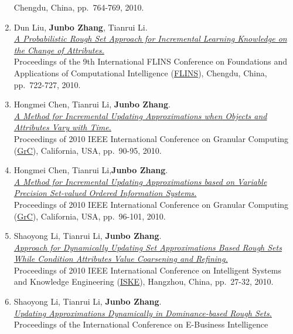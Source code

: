 \documentclass[]{article}
\begin{document}
\begin{enumerate}
  Chengdu, China, pp.~764-769, 2010.
\item
  Dun Liu, \textbf{Junbo Zhang}, Tianrui Li.\\
  \href{http://dx.doi.org/10.1142/9789814324700_0109}{\emph{A
  Probabilistic Rough Set Approach for Incremental Learning Knowledge on
  the Change of Attributes.}}\\ Proceedings of the 9th International
  FLINS Conference on Foundations and Applications of Computational
  Intelligence
  (\href{http://www.wikicfp.com/cfp/servlet/event.showcfp?eventid=7359\&copyownerid=2}{FLINS}),
  Chengdu, China, pp.~722-727, 2010.
\item
  Hongmei Chen, Tianrui Li, \textbf{Junbo Zhang}.\\
  \href{http://dx.doi.org/10.1109/GrC.2010.116}{\emph{A Method for
  Incremental Updating Approximations when Objects and Attributes Vary
  with Time.}}\\ Proceedings of 2010 IEEE International Conference on
  Granular Computing
  (\href{http://xanadu.cs.sjsu.edu/~grc/grc2010}{GrC}), California, USA,
  pp.~90-95, 2010.
\item
  Hongmei Chen, Tianrui Li,\textbf{Junbo Zhang}.\\
  \href{http://dx.doi.org/10.1109/GrC.2010.115}{\emph{A Method for
  Incremental Updating Approximations based on Variable Precision
  Set-valued Ordered Information Systems.}}\\ Proceedings of 2010 IEEE
  International Conference on Granular Computing
  (\href{http://xanadu.cs.sjsu.edu/~grc/grc2010}{GrC}), California, USA,
  pp.~96-101, 2010.
\item
  Shaoyong Li, Tianrui Li, \textbf{Junbo Zhang}.\\
  \href{http://dx.doi.org/10.1109/ISKE.2010.5680788}{\emph{Approach for
  Dynamically Updating Set Approximations Based Rough Sets While
  Condition Attributes Value Coarsening and Refining.}}\\ Proceedings of
  2010 IEEE International Conference on Intelligent Systems and
  Knowledge Engineering
  (\href{http://ieeexplore.ieee.org/xpl/mostRecentIssue.jsp?punumber=5676709}{ISKE}),
  Hangzhou, China, pp.~27-32, 2010.
\item
  Shaoyong Li, Tianrui Li, \textbf{Junbo Zhang}.\\
  \href{http://www.atlantis-press.com/php/paper-details.php?id=2011}{\emph{Updating
  Approximations Dynamically in Dominance-based Rough Sets.}}\\
  Proceedings of the International Conference on E-Business Intelligence

\end{enumerate}
\end{document}
